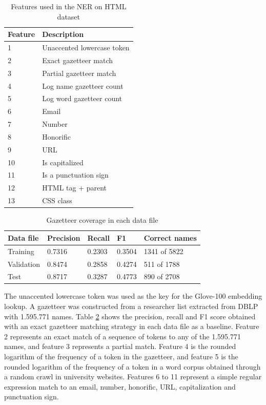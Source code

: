 \documentclass[sigconf]{acmart}
\begin{document}
\begin{table}[h]
  \small
  \begin{center}
    \begin{tabular}{ ll }
      \toprule
      Feature & Description \\
      \midrule
      1  & Unaccented lowercase token \\
      2  & Exact gazetteer match \\
      3  & Partial gazetteer match \\
      4  & Log name gazetteer count\\
      5  & Log word gazetteer count\\
      6  & Email \\
      7  & Number \\
      8  & Honorific \\
      9  & URL \\
      10 & Is capitalized \\
      11 & Is a punctuation sign \\
      12 & HTML tag + parent \\
      13 & CSS class \\
      \bottomrule
    \end{tabular}
  \end{center}
  \caption{Features used in the NER on HTML dataset}
  \label{tab:features}
\end{table}

\begin{table}[h]
  \small
  \begin{center}
    \begin{tabular}{ lllll }
      \toprule
      Data file & Precision & Recall & F1 & Correct names \\
      \midrule
      Training   & 0.7316 & 0.2303 & 0.3504 & 1341 of 5822 \\ 
      Validation & 0.8474 & 0.2858 & 0.4274 & 511 of 1788 \\ 
      Test       & 0.8717 & 0.3287 & 0.4773 & 890 of 2708 \\ 
      \bottomrule
    \end{tabular}
  \end{center}
  \caption{Gazetteer coverage in each data file}
  \label{tab:gazetteer}
\end{table}

The unaccented lowercase token was used as the key for the Glove-100 embedding lookup.
A gazetteer was constructed from a researcher list extracted from DBLP with 1.595.771
names. Table \ref{tab:gazetteer} shows the precision, recall and F1 score obtained with an
exact gazetteer matching strategy in each data file as a baseline.
Feature 2 represents an exact match of a sequence of tokens to any of the 1.595.771 
names, and feature 3 represents a partial match. Feature 4 is the rounded logarithm of 
the frequency of a token in the gazetteer, and feature 5 is the rounded logarithm of the frequency
of a token in a word corpus obtained through a random crawl in university websites.
Features 6 to 11 represent a simple regular expression match to an email, number, 
honorific, URL, capitalization and punctuation sign.
\end{document}
